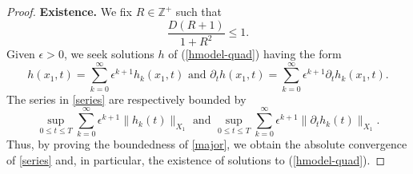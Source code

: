 \documentclass[11pt]{article}
\theoremstyle{plain}
\theoremstyle{definition}
\theoremstyle{definition}
\def\bbZ{{\mathbb Z}}
\begin{document}
\begin{proof}
\textbf{Existence.}
We fix $R\in \bbZ^+$ such that
$$
\frac{D(R+1)}{1+R^2}\leq 1.
$$
Given $\epsilon>0$, we seek  solutions $h$ of {\rm(\ref{hmodel-quad})} having the form
\begin{equation}\label{series}
h(x_1,t)=\sum_{k=0}^\infty\epsilon^{k+1}h_k(x_1,t)\text{ \ and \ }\partial_t h(x_1,t)=\sum_{k=0}^\infty\epsilon^{k+1}\partial_t h_k(x_1,t).
\end{equation}
The series in \eqref{series} are respectively bounded by
\begin{equation}\label{major}
\sup_{0\leq t\leq T}\sum_{k=0}^\infty\epsilon^{k+1}\|h_k(t)\|_{X_1}\text{ \ and \ }\sup_{0\leq t\leq T}\sum_{k=0}^\infty\epsilon^{k+1}\|\partial_t h_k(t)\|_{X_1}.
\end{equation}
Thus, by proving the boundedness of \eqref{major}, we obtain the absolute convergence of \eqref{series} and, in particular, the existence of solutions to {\rm(\ref{hmodel-quad})}.


\end{proof}
\end{document}

